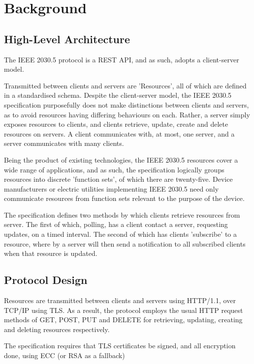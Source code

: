 \chapter{Background}\label{ch:background}

\section{High-Level Architecture}
The IEEE 2030.5 protocol is a REST API, and as such, adopts a client-server model.

Transmitted between clients and servers are 'Resources', all of which are defined in a standardised schema. 
Despite the client-server model, the IEEE 2030.5 specification purposefully does not make distinctions between clients and servers, as to avoid resources having differing behaviours on each. Rather, a server simply exposes resources to clients, and clients retrieve, update, create and delete resources on servers.
A client communicates with, at most, one server, and a server communicates with many clients.

Being the product of existing technologies, the IEEE 2030.5 resources cover a wide range of applications, and as such, the specification logically groups resources into discrete 'function sets', of which there are twenty-five. 
Device manufacturers or electric utilities implementing IEEE 2030.5 need only communicate resources from function sets relevant to the purpose of the device. 

The specification defines two methods by which clients retrieve resources from server. The first of which, polling, has a client contact a server, requesting updates, on a timed interval. 
The second of which has clients 'subscribe' to a resource, where by a server will then send a notification to all subscribed clients when that resource is updated.
\cite{IEEE2030.5}

\section{Protocol Design}
Resources are transmitted between clients and servers using HTTP/1.1, over TCP/IP using TLS.
As a result, the protocol employs the usual HTTP request methods of GET, POST, PUT and DELETE for retrieving, updating, creating and deleting resources respectively.

The specification requires that TLS certificates be signed, and all encryption done, using ECC (or RSA as a fallback)

